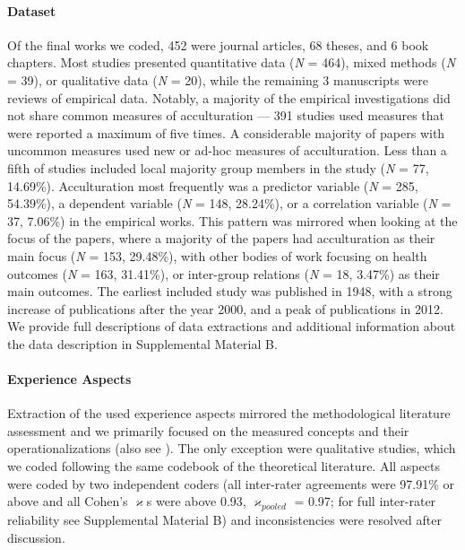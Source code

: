 \paragraph{Dataset}

Of the final works we coded, 452 were journal articles, 68 theses, and 6
book chapters. Most studies presented quantitative data (\textit{N} =
464), mixed methods (\textit{N} = 39), or qualitative data (\textit{N} =
20), while the remaining 3 manuscripts were reviews of empirical data.
Notably, a majority of the empirical investigations did not share common
measures of acculturation --- 391 studies used measures that were
reported a maximum of five times. A considerable majority of papers with
uncommon measures used new or ad-hoc measures of acculturation. Less
than a fifth of studies included local majority group members in the
study (\textit{N} = 77, 14.69\%). Acculturation most frequently was a
predictor variable (\textit{N} = 285, 54.39\%), a dependent variable
(\textit{N} = 148, 28.24\%), or a correlation variable (\textit{N} = 37,
7.06\%) in the empirical works. This pattern was mirrored when looking
at the focus of the papers, where a majority of the papers had
acculturation as their main focus (\textit{N} = 153, 29.48\%), with
other bodies of work focusing on health outcomes (\textit{N} = 163,
31.41\%), or inter-group relations (\textit{N} = 18, 3.47\%) as their
main outcomes. The earliest included study was published in 1948, with a
strong increase of publications after the year 2000, and a peak of
publications in 2012. We provide full descriptions of data extractions
and additional information about the data description in Supplemental
Material B.

\paragraph{Experience Aspects}

Extraction of the used experience aspects mirrored the methodological
literature assessment and we primarily focused on the measured concepts
and their operationalizations (also see ).
The only exception were qualitative studies, which we coded following
the same codebook of the theoretical literature. All aspects were coded
by two independent coders (all inter-rater agreements were 97.91\% or
above and all Cohen's \(\varkappa\)s were above 0.93,
\(\varkappa_{pooled}\) = 0.97; for full inter-rater reliability see
Supplemental Material B) and inconsistencies were resolved after
discussion.

